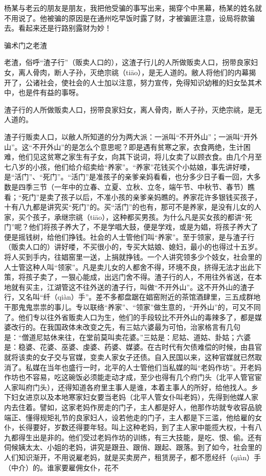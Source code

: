\documentclass[12pt,UTF8]{ctexbook}
\begin{document}
杨某与老云的朋友是朋友，我把他受骗的事写出来，揭穿个中黑幕，杨某的姓名就不用说了。他被骗的原因是在通州吃早饭时露了财，才被骗匪注意，设局将款骗去。看起来还是行路别露财为妙！





骗术门之老渣


老渣，俗呼“渣子行”（贩卖人口的），这渣子行儿的人所做贩卖人口，拐带良家妇女，离人骨肉，断人子孙，灭绝宗祧（tiāo），是无人道的。敝人将他们的内幕揭开了，公诸社会，使社会的人士加以注意，努力宣传，免得知识幼稚的妇女坠其术中，也是件有益的事呀。

渣子行的人所做贩卖人口，拐带良家妇女，离人骨肉，断人子孙，灭绝宗祧，是无人道的。



渣子行贩卖人口，以敝人所知道的分为两大派：一派叫“不开外山”；一派叫“开外山”。这“不开外山”的是怎么个意思呢？即是遇有贫寒之家，衣食两绝，生计困难，他们见这贫寒之家生有子女，向其下说词，将儿女卖了以顾衣食。由几个月至七八岁的小孩，他们给介绍卖给“养家”。“养家”花钱买个小姑娘，事先讲好喽，是“活门”、“死门”。“活门”是准孩子的亲爹亲妈看看，也分多少日子看一回，大多数是四季三节（一年中的立春、立夏、立秋、立冬，端午节、中秋节、春节）瞧看；“死门”是卖了孩子以后，不准小孩的亲爹亲妈瞧的。养家花许多银钱买孩子，十有八九都是讲究买“死门”的。买“活门”的也有，那可不是养家，是没有儿女的人家，买个孩子，承继宗祧（tiāo），这种都买男孩。为什么凡是买女孩的都讲“死门”呢？他们将孩子养大了，不是学唱大鼓，便是学戏，或是为娼，将孩子养大了便是摇钱树，给他们挣钱。社会的人士管他们叫“养家”。至于领家，是与渣子行（贩卖人口的）讲好喽，不买很小的，专买大姑娘、媳妇，最小的也得过十五岁。将人买到手内，往娼窑里一送，上捐就挣钱。一个人讲究领多少个妓女，社会里的人士管这种人叫“领家”。凡是卖儿女的人都舍不得，环境不良，挤得无法才出此下策，将孩子卖了，一狠心能成，出远门舍不得。渣子行的人，不用往外省送，在本地就有买主，江湖管这不往外送的渣子行，叫做“不开外山”。这不开外山的渣子行，又名叫“纤（qiàn）手”。差不多都盘踞在娼窑附近的茶馆酒肆里，三五成群地干那鬼鬼祟祟的事儿。专以联络“养家”、“领家”做生意的，“开外山”的，可又不同了。他们专以往外省贩卖人口为生，他们的手段较比不开外山的毒辣多了，都是媒婆改行的。在我国政体未改变之先，有三姑六婆最为可怕，治家格言有几句是：“僧道尼姑休来往，在堂前莫叫卖花婆。”三姑是：尼姑、道姑、卦姑；六婆是：稳婆、花婆、巫婆、虔婆、药婆、媒婆。在古时代有欠债难偿的时候，由县官就将该卖的女子交与官媒，变卖人家女子还债。自入民国以来，这种官媒就已然取消了。私媒在当年也盛行一时，北平的人士管他们当私媒的叫“老妈作坊”。开老妈作坊也不容易，吃这碗饭必须能走动才成，至少也得有几个府门头（北平人管官宦人家叫府门头），还得知道各府里主事人是谁，本着主事人的所好，给他找人。乡下妇女进京以及本地寒家妇女要当老妈（北平人管女仆叫老妈），先得到他媒人家内去住着。譬如，这家老妈作房走的门子，主人都是好人，他那作坊就专收容品貌端正、懂得规矩礼节的良家妇人，设若他走的门子，主人都是下三滥，他给雇的女仆，长得要好，岁数还得要年轻。叫上这种老妈，到了主人家中能揽大权，十有八九都得生出是非的。他们受过老妈作坊的训练，有三大技能，是吃、恨、偷。还有伺候姨太太、小姐的老妈，讲究是跟丑、跟俏、跟起、跟落。到了如今，社会里的人们知识渐开，不用说雇老妈，就是买卖房产，租赁房子，都不愿经纤（qiàn）手（中介）的。谁家要雇佣女仆，花不
\end{document}

